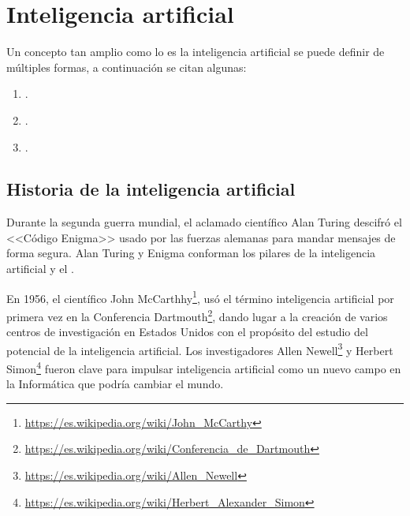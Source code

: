 
\section{Inteligencia artificial}

Un concepto tan amplio como lo es la inteligencia artificial se puede definir de múltiples formas, a continuación se citan algunas:

\begin{enumerate}
    \item {} \cite{kaplan_haenlein_2019}.
    \item {} \cite{albus_1991}.
    \item {} \cite{poole_mackworth_goebel_1998}.
\end{enumerate}

\subsection{Historia de la inteligencia artificial}
Durante la segunda guerra mundial, el aclamado científico Alan Turing descifró el <<Código Enigma>> usado por las fuerzas alemanas para mandar mensajes de forma segura. Alan Turing y Enigma conforman los pilares de la inteligencia artificial y el .

En 1956, el científico John McCarthhy\footnote{\url{https://es.wikipedia.org/wiki/John\_McCarthy}}, usó el término inteligencia artificial por primera vez en la Conferencia Dartmouth\footnote{\url{https://es.wikipedia.org/wiki/Conferencia\_de\_Dartmouth}}, dando lugar a la creación de varios centros de investigación en Estados Unidos con el propósito del estudio del potencial de la inteligencia artificial. Los investigadores Allen Newell\footnote{\url{https://es.wikipedia.org/wiki/Allen\_Newell}} y Herbert Simon\footnote{\url{https://es.wikipedia.org/wiki/Herbert\_Alexander\_Simon}}  fueron clave para impulsar inteligencia artificial como un nuevo campo en la Informática que podría cambiar el mundo.


